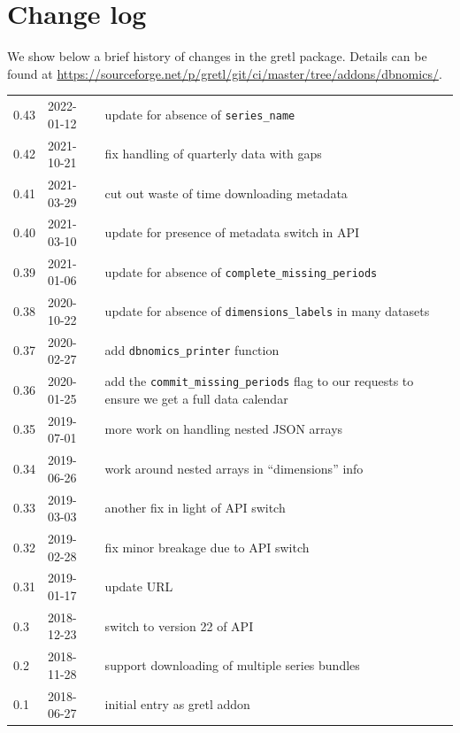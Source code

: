\documentclass{article}
\begin{document}
\clearpage

\section{Change log}
\label{sec:change-log}

We show below a brief history of changes in the gretl \DB{}
package. Details can be found at
\url{https://sourceforge.net/p/gretl/git/ci/master/tree/addons/dbnomics/}.

\begin{tabular}{llp{}}
  0.43 & 2022-01-12 & update for absence of \texttt{series\_name} \\
  0.42 & 2021-10-21 & fix handling of quarterly data with gaps \\
  0.41 & 2021-03-29 & cut out waste of time downloading metadata \\
  0.40 & 2021-03-10 & update for presence of metadata switch in API \\
  0.39 & 2021-01-06 & update for absence of
                      \texttt{complete\_missing\_periods} \\
  0.38 & 2020-10-22 & update for absence of
                      \texttt{dimensions\_labels} in
                      many datasets \\
  0.37 & 2020-02-27 & add \texttt{dbnomics\_printer} function \\
  0.36 & 2020-01-25 & add the \texttt{commit\_missing\_periods} flag to our \DB{}
                      requests to ensure we get a full data calendar \\
  0.35 & 2019-07-01 & more work on handling nested JSON arrays \\
  0.34 & 2019-06-26 & work around nested arrays in \DB{} ``dimensions'' info\\
  0.33 & 2019-03-03 & another fix in light of API switch \\
  0.32 & 2019-02-28 & fix minor breakage due to API switch\\
  0.31 & 2019-01-17 & update \DB{} URL\\
  0.3 & 2018-12-23 & switch to version 22 of \DB{} API\\
  0.2 & 2018-11-28 & support downloading of multiple series bundles\\
  0.1 & 2018-06-27 & initial entry as gretl addon
\end{tabular}
\end{document}
